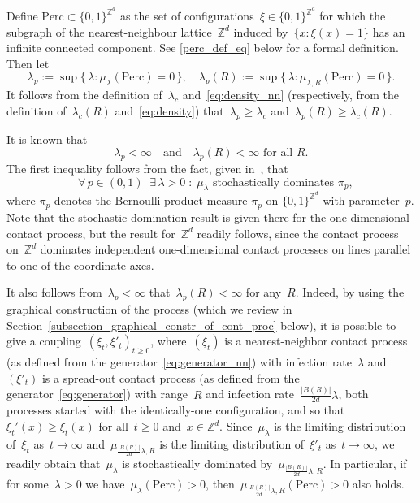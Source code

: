 \documentclass[a4paper,12pt]{article}
\newcommand{\Z}{\mathbb{Z}}
\begin{document}
Define $\text{Perc} \subset \{0,1\}^{\Z^d}$ as the set of configurations~$\xi \in \{0,1\}^{\Z^d}$ for which the subgraph of the nearest-neighbour lattice~$\Z^d$ induced by~$\{x: \xi(x) = 1\}$ has an infinite connected component.  See \eqref{perc_def_eq} below for a formal definition. Then let
$$
 \lambda_p := \sup\{ \, \lambda: \mu_\lambda(\text{Perc}) = 0 \, \},
 \quad
  \lambda_p(R):= \sup\{ \, \lambda: \mu_{\lambda,R}(\text{Perc}) = 0 \, \}.
 $$
It follows from the definition of~$\lambda_c$ and~\eqref{eq:density_nn} (respectively, from the definition of~$\lambda_c(R)$ and~\eqref{eq:density}) that~$\lambda_p \ge \lambda_c$ and~$\lambda_p(R) \ge \lambda_c(R)$.

It is known that
\begin{equation*}
\lambda_p < \infty \quad \text{and}\quad \lambda_p(R) < \infty \text{ for all }R.
\end{equation*}
The first inequality follows from the fact, given in~\cite[Theorem~2.1]{LS06}, that
\begin{equation}\label{liggett_steif_stoch_dom_result}
\text{ $\forall\, p \in (0,1)\; \; \exists\,  \lambda > 0 \; : \; \mu_\lambda$ stochastically dominates $\pi_p$,}
  \end{equation}
where $\pi_p$ denotes  the Bernoulli product measure $\pi_p$ on $\{0,1\}^{\mathbb{Z}^d}$ with parameter~$p$.
 Note that the stochastic domination result is given there for the one-dimensional contact process, but the result for~$\Z^d$ readily follows, since the contact process on~$\Z^d$ dominates independent one-dimensional contact processes on lines parallel to one of the coordinate axes.

 It also follows from~$\lambda_p < \infty$ that~$\lambda_p(R) < \infty$ for any~$R$. Indeed, by using the graphical construction of the process (which we review in Section~\ref{subsection_graphical_constr_of_cont_proc} below), it is possible to give a coupling~$(\xi_t,\xi'_t)_{t \ge 0}$, where~$(\xi_t)$ is a nearest-neighbor contact process (as defined from the generator~\eqref{eq:generator_nn}) with infection rate~$\lambda$ and~$(\xi'_t)$ is a spread-out contact process (as defined from the generator~\eqref{eq:generator}) with range~$R$ and infection rate~$\frac{|B(R)|}{2d}\lambda$, both processes started with the identically-one configuration, and so that~$\xi_t'(x) \ge \xi_t(x)$ for all~$t \ge 0$ and~$x \in \Z^d$. Since~$\mu_\lambda$ is the limiting distribution of~$\xi_t$ as~$t \to \infty$ and~$\mu_{\frac{|B(R)|}{2d}\lambda,R}$ is the limiting distribution of~$\xi'_t$ as~$t \to \infty$, we readily obtain that~$\mu_\lambda$ is stochastically dominated by~$\mu_{\frac{|B(R)|}{2d}\lambda,R}$. In particular, if for some~$\lambda > 0$ we have~$\mu_\lambda(\text{Perc}) > 0$, then~$\mu_{\frac{|B(R)|}{2d}\lambda,R}(\text{Perc}) > 0$ also holds.
\end{document}
